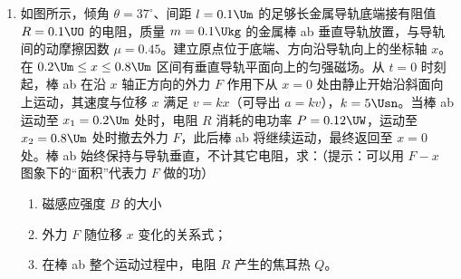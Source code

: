 \documentclass[\gkver]{gaokaozhenti}
\begin{document}
\begin{enumerate}
{\begin{enumerate}
	\item
	短接 G 表前后各摇动 G 表一次，比较指针偏转，有明显变化，则线圈未断；反之则断了。
\end{enumerate}
}

\item
如图所示，倾角 $\theta=37^\circ$、间距 $l=0.1\Um$ 的足够长金属导轨底端接有阻值 $R=0.1\UO$ 的电阻，质量 $m=0.1\Ukg$ 的金属棒 ab 垂直导轨放置，与导轨间的动摩擦因数 $\mu=0.45$。建立原点位于底端、方向沿导轨向上的坐标轴 $x$。在 $0.2\Um\leq x\leq0.8\Um$ 区间有垂直导轨平面向上的匀强磁场。从 $t=0$ 时刻起，棒 ab 在沿 $x$ 轴正方向的外力 $F$ 作用下从 $x=0$ 处由静止开始沿斜面向上运动，其速度与位移 $x$ 满足 $v=kx$（可导出 $a=kv$），$k=5\Usn$。当棒 ab 运动至 $x_{1}=0.2\Um$ 处时，电阻 $R$ 消耗的电功率 $P=0.12\UW$，运动至 $x_{2}=0.8\Um$ 处时撤去外力 $F$，此后棒 ab 将继续运动，最终返回至 $x=0$ 处。棒 ab 始终保持与导轨垂直，不计其它电阻，求：（提示：可以用 $F-x$ 图象下的“面积”代表力 $F$ 做的功）
\begin{enumerate}
	\item
	磁感应强度 $B$ 的大小
	\item
	外力 $F$ 随位移 $x$ 变化的关系式；
	\item
	在棒 ab 整个运动过程中，电阻 $R$ 产生的焦耳热 $Q$。
\end{enumerate}
\end{enumerate}
\end{document}
